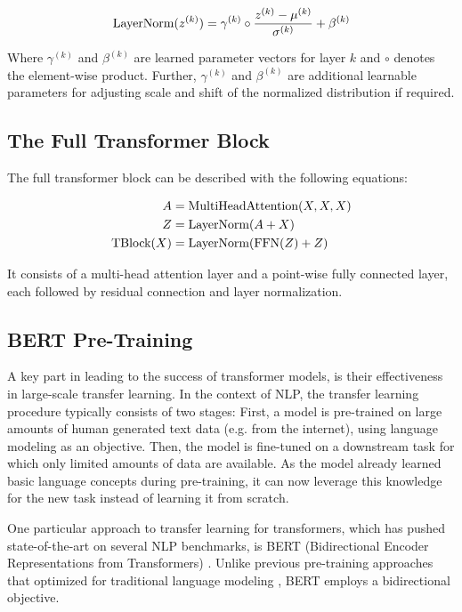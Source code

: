 \begin{equation}
    \text{LayerNorm}(z^{(k)}) = \gamma ^{(k)} \circ \frac{z^{(k)} - \mu^{(k)}}{\sigma^{(k)}} + \beta^{(k)}
\end{equation}



Where $\gamma^{(k)}$ and $\beta^{(k)}$ are learned parameter vectors for layer $k$ and $\circ$ denotes the element-wise product. Further, $\gamma^{(k)}$ and $\beta^{(k)}$ are additional learnable parameters for adjusting scale and shift of the normalized distribution if required.

\subsection{The Full Transformer Block}

The full transformer block can be described with the following equations:

\begin{align}
    A              & = \text{MultiHeadAttention}(X, X, X) \\
    Z              & = \text{LayerNorm}(A + X)            \\
    \text{TBlock}(X) & = \text{LayerNorm}(\text{FFN}(Z) + Z)
\end{align}

It consists of a multi-head attention layer and a point-wise fully connected layer, each followed by residual connection and layer normalization.


\subsection{BERT Pre-Training}
A key part in leading to the success of transformer models, is their effectiveness in large-scale transfer learning. In the context of NLP, the transfer learning procedure typically consists of two stages: First, a model is pre-trained on large amounts of human generated text data (e.g. from the internet), using language modeling as an objective. Then, the model is fine-tuned on a downstream task for which only limited amounts of data are available. As the model already learned basic language concepts during pre-training, it can now leverage this knowledge for the new task instead of learning it from scratch.

One particular approach to transfer learning for transformers, which has pushed state-of-the-art on several NLP benchmarks, is BERT (Bidirectional Encoder Representations from Transformers) \cite{devlin-etal-2019-bert}. Unlike previous pre-training approaches that optimized for traditional  language modeling \cite{DBLP:journals/corr/abs-1801-06146,Peters:2018,radford2018improving}, BERT employs a bidirectional objective.


